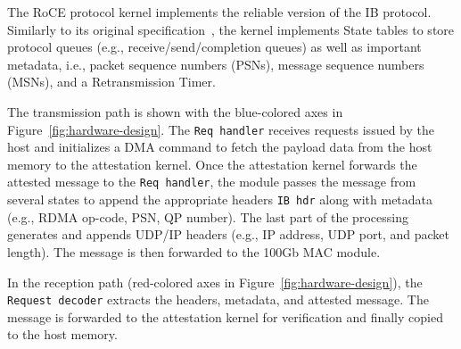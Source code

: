 The RoCE protocol kernel implements the reliable version of the IB protocol. Similarly to its original specification~\cite{rdma_specification}, the kernel implements State tables to store protocol queues (e.g., receive/send/completion queues) as well as important metadata, i.e.,  packet sequence numbers (PSNs), message sequence numbers (MSNs), and a Retransmission Timer. %

The transmission path is shown with the blue-colored axes in Figure~\ref{fig:hardware-design}. The {\tt Req handler} receives requests issued by the host and initializes a DMA command to fetch the payload data from the host memory to the attestation kernel. Once the attestation kernel forwards the attested message to the {\tt Req handler}, the module passes the message from several states to append the appropriate headers {\tt IB hdr} along with metadata (e.g., RDMA op-code, PSN, QP number). The last part of the processing generates and appends UDP/IP headers (e.g., IP address, UDP port, and packet length). The message is then forwarded to the 100Gb MAC module. 
 
In the reception path (red-colored axes in Figure~\ref{fig:hardware-design}), the {\tt Request decoder} extracts the headers, metadata, and attested message. The message is forwarded to the attestation kernel for verification and finally copied to the host memory.

